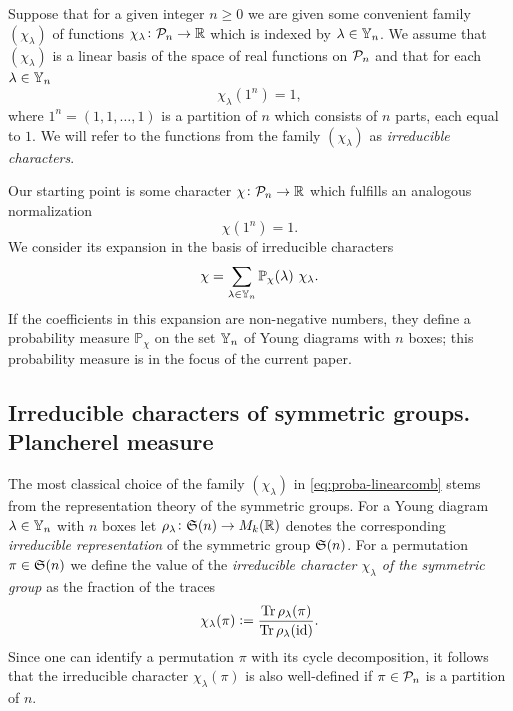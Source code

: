 \documentclass[12pt,usenames,dvipsnames,svgnames,table]{amsart}
\begin{document}
Suppose that for a given integer $n\geq 0$ 
we are given some convenient family $(\chi_\lambda)$
of functions $\chi_\lambda\colon \mathcal{P}_{n}\to\mathbb{R}$ which is indexed by 
$\lambda\in\mathbb{Y}_{n}$.
We assume that $(\chi_\lambda)$ is a linear basis of the space of 
real functions on $\mathcal{P}_{n}$ and that for each $\lambda\in\mathbb{Y}_{n}$
\[  \chi_\lambda(1^n)= 1, \]
where $1^n=(1,1,\dots,1)$ is a partition of $n$ which consists of $n$ parts, each equal to $1$.
We will refer to the functions from the family $(\chi_\lambda)$ as \emph{irreducible characters}.

Our starting point is some character $\chi\colon\mathcal{P}_{n}\to\mathbb{R}$ which fulfills
an analogous normalization 
\[  \chi(1^n)= 1. \]
We consider its expansion in the basis of irreducible characters
\begin{equation}
\label{eq:proba-linearcomb}
\chi = \sum_{\lambda\in\Young{n}} \mathbb{P}_\chi(\lambda) \ \chi_\lambda.   
\end{equation}
If the coefficients in this expansion are non-negative numbers, 
they define a probability measure $\mathbb{P}_\chi$ on the set $\mathbb{Y}_{n}$
of Young diagrams with $n$ boxes; this probability measure is in the focus of the current paper.

\subsection{Irreducible characters of symmetric groups. Plancherel measure}

The most classical choice of the family $(\chi_\lambda)$ in \eqref{eq:proba-linearcomb}
stems from the representation theory of the symmetric groups.
For a Young diagram $\lambda\in\mathbb{Y}_{n}$ with $n$ boxes let $\rho_\lambda\colon \mathfrak{S}(n) \to M_k(\mathbb{R})$ denotes 
the corresponding \emph{irreducible representation} \cite{SaganSymmetric} of the symmetric group $\mathfrak{S}(n)$.
For a permutation $\pi\in \mathfrak{S}(n)$ we define the value of the \emph{irreducible character $\chi_\lambda$
	of the symmetric group} 
as the fraction of the traces
\begin{equation}
\label{eq:character-irrep}
\chi_\lambda(\pi):= \frac{\operatorname{Tr} \rho_\lambda(\pi)}{\operatorname{Tr} \rho_\lambda(\operatorname{id})}.   
\end{equation}
Since one can identify a permutation $\pi$ with its cycle decomposition,
it follows that the irreducible character $\chi_\lambda(\pi)$ 
is also well-defined if $\pi\in\mathcal{P}_{n}$ is a partition of $n$.
\end{document}
